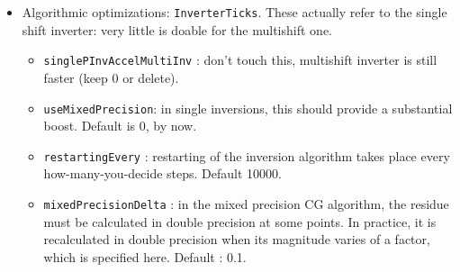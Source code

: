 \begin{itemize}
\item{Algorithmic optimizations: \verb|InverterTicks|. }
 These actually refer to the single shift inverter: very little is doable for 
the multishift one.
\begin{itemize}
 \item \verb|singlePInvAccelMultiInv| : don't touch this, multishift 
inverter is still faster (keep 0 or delete).
 \item \verb|useMixedPrecision|: in single inversions, this should provide a 
substantial boost. Default is 0, by now.
 \item \verb|restartingEvery| : restarting of the inversion algorithm takes 
place every how-many-you-decide steps. Default 10000.
 \item \verb|mixedPrecisionDelta| : in the mixed precision CG algorithm, the 
residue must be calculated in double precision at some points. In practice, it 
is recalculated in double precision when its magnitude varies of a factor, 
which is specified here. Default : 0.1.
\end{itemize}
        

\end{itemize}
